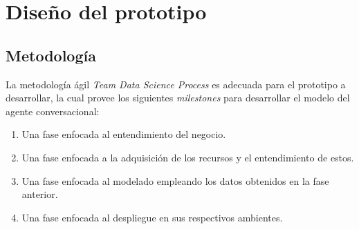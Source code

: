 \chapter{Diseño del prototipo}
    \section{Metodología}
        La metodología ágil \textit{Team Data Science Process} es adecuada para el prototipo a desarrollar, la cual provee los siguientes \textit{milestones} para desarrollar el modelo del agente conversacional:
        \begin{enumerate}
            \item Una fase enfocada al entendimiento del negocio. 
            \item Una fase enfocada a la adquisición de los recursos y el entendimiento de estos.
            \item Una fase enfocada al modelado empleando los datos obtenidos en la fase anterior.
            \item Una fase enfocada al despliegue en sus respectivos ambientes.
        \end{enumerate}
        

